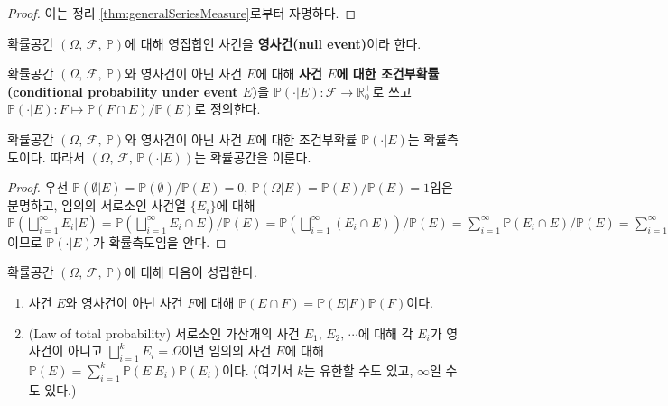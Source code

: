 \begin{proof}
    이는 정리 \ref{thm:generalSeriesMeasure}로부터 자명하다.
\end{proof}

\begin{definition}
    확률공간 $(\Omega,\,\mathcal{F},\,\mathbb{P})$에 대해 영집합인 사건을 \textbf{영사건(null event)}이라 한다.
\end{definition}

\begin{definition}
    확률공간 $(\Omega,\,\mathcal{F},\,\mathbb{P})$와 영사건이 아닌 사건 $E$에 대해 \textbf{사건 $E$에 대한 조건부확률(conditional probability under event $E$)}을  $\mathbb{P}(\cdot\vert E):\mathcal{F}\to\mathbb{R}^+_0$로 쓰고 $\mathbb{P}(\cdot\vert E):F\mapsto\mathbb{P}(F\cap E)/\mathbb{P}(E)$로 정의한다.
\end{definition}

\begin{theorem}
    확률공간 $(\Omega,\,\mathcal{F},\,\mathbb{P})$와 영사건이 아닌 사건 $E$에 대한 조건부확률 $\mathbb{P}(\cdot\vert E)$는 확률측도이다. 따라서 $(\Omega,\,\mathcal{F},\,\mathbb{P}(\cdot\vert E))$는 확률공간을 이룬다.
\end{theorem}

\begin{proof}
    우선 $\mathbb{P}(\emptyset\vert E)=\mathbb{P}(\emptyset)/\mathbb{P}(E)=0,\,\mathbb{P}(\Omega\vert E)=\mathbb{P}(E)/\mathbb{P}(E)=1$임은 분명하고, 임의의 서로소인 사건열 $\{E_i\}$에 대해 $\mathbb{P}(\bigsqcup_{i=1}^\infty E_i\vert E)=\mathbb{P}(\bigsqcup_{i=1}^\infty E_i\cap E)/\mathbb{P}(E)=\mathbb{P}(\bigsqcup_{i=1}^\infty(E_i\cap E))/\mathbb{P}(E)=\sum_{i=1}^\infty\mathbb{P}(E_i\cap E)/\mathbb{P}(E)=\sum_{i=1}^\infty\mathbb{P}(E_i\vert E)$이므로 $\mathbb{P}(\cdot\vert E)$가 확률측도임을 안다.
\end{proof}

\begin{theorem}
    확률공간 $(\Omega,\,\mathcal{F},\,\mathbb{P})$에 대해 다음이 성립한다.
    \begin{enumerate}
        \item 사건 $E$와 영사건이 아닌 사건 $F$에 대해 $\mathbb{P}(E\cap F)=\mathbb{P}(E\vert F)\mathbb{P}(F)$이다.
        \item (Law of total probability) 서로소인 가산개의 사건 $E_1,\,E_2,\,\cdots$에 대해 각 $E_i$가 영사건이 아니고 $\bigsqcup_{i=1}^kE_i=\Omega$이면 임의의 사건 $E$에 대해 $\mathbb{P}(E)=\sum_{i=1}^k\mathbb{P}(E\vert E_i)\mathbb{P}(E_i)$이다. (여기서 $k$는 유한할 수도 있고, $\infty$일 수도 있다.)
    \end{enumerate}
\end{theorem}

